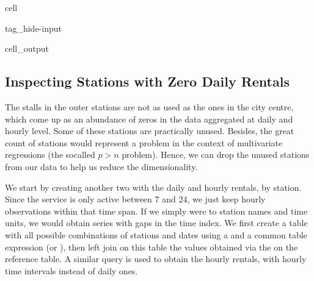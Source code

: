 \documentclass[letterpaper,10pt,english]{jupyterBook}
\begin{document}
\begin{sphinxuseclass}{cell}
\begin{sphinxuseclass}{tag_hide-input}
\begin{sphinxuseclass}{cell_output}
\noindent{}

\end{sphinxuseclass}
\end{sphinxuseclass}
\end{sphinxuseclass}

\subsection{Inspecting Stations with Zero Daily Rentals}
\label{\detokenize{03-data_ingestion_and_spatial_operations:inspecting-stations-with-zero-daily-rentals}}
\sphinxAtStartPar
The stalls in the outer stations are not as used as the ones in the city centre, which come up as an abundance of zeros in the data aggregated at daily and hourly level. Some of these stations are practically unused. Besides, the great count of stations would represent a problem in the context of multivariate regressions (the so\sphinxhyphen{}called \(p > n\) problem). Hence, we can drop the unused stations from our data to help us reduce the dimensionality.

\sphinxAtStartPar
We start by creating another two  with the daily and hourly rentals, by station. Since the service is only active between 7 and 24, we just keep hourly observations within that time span. If we simply were to  station names and time units, we would obtain series with gaps in the time index. We first create a table with all possible combinations of stations and dates using a  and a common table expression (or ), then left join on this table the values obtained via the  on the reference table. A similar query is used to obtain the hourly rentals, with hourly time intervals instead of daily ones.
\end{document}

